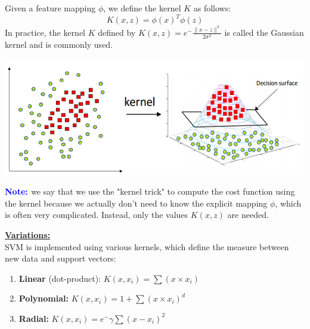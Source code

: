 \documentclass[letterpaper, 10.5pt,landscape]{article}
\begin{document}
\begin{multicols*}{3}
Given a feature mapping $\phi$, we define the kernel $K$ as follows:
\vspace{-5pt}
\[\boxed{K(x, z) = \phi(x)^{T} \phi(z)} \] 
In practice, the kernel $K$ defined by $\boxed{K(x, z) =  e^-{\frac{\lVert x - z \rVert^{2}}{2\sigma^{2}}}}$ is called the Gaussian kernel and is commonly used.

\vspace{-5pt}
\begin{center}
    \begin{minipage}{0.9\linewidth}
    \includegraphics[width=\textwidth]{figures/kernel_SVM.PNG}
    \end{minipage}
\end{center}

\vspace{-5pt}

\textbf{\textcolor{blue}{Note: }} we say that we use the "kernel trick" to compute the cost function using the kernel because we actually don't need to know the explicit mapping $\phi$, which is often very complicated. Instead, only the values $K(x,z)$ are needed.



\vspace{3pt}
\textbf{\underline{Variations:}} \\
SVM is implemented using various kernels, which define the
measure between new data and support vectors:
\vspace{-3pt}
\begin{enumerate}
    \item \textbf{Linear} (dot-product):  \hspace{5pt} \(\boxed{K(x, x_{i}) = \sum(x \times x_{i})} \)
    \vspace{-3pt}
    \item \textbf{Polynomial:}  \hspace{38pt} \( \boxed{K(x, x_{i}) = 1 + \sum(x \times x_{i})^{d} }\)
    \vspace{-3pt}
    \item \textbf{Radial:}  \hspace{55pt} \(\boxed{K(x, x_{i}) = e^-{\gamma \sum (x - x_{i})^{2}}}\)
\end{enumerate}



\end{multicols*}
\end{document}
